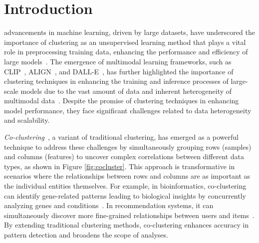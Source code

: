 \documentclass[journal]{IEEEtran}
\renewcommand{\cite}[1]{~\autocite{#1}}
\begin{document}
\section{Introduction}
 advancements in machine learning, driven by large datasets, have underscored the importance of clustering as an unsupervised learning method that plays a vital role in preprocessing training data, enhancing the performance and efficiency of large models\cite{raskutti2002CombiningClusteringCotraining, li2014ClusteringguidedSparseStructural, ghimatgar2018ImprovedFeatureSelection, li2023DistributedClusteringCooperative, bertsimas2020InterpretableClusteringOptimization}. The emergence of multimodal learning frameworks, such as CLIP\cite{radford2021LearningTransferableVisual}, ALIGN\cite{li2022BLIPBootstrappingLanguageimage}, and DALL-E\cite{ramesh2021ZeroshotTexttoimageGeneration}, has further highlighted the importance of clustering techniques in enhancing the training and inference processes of large-scale models due to the vast amount of data and inherent heterogeneity of multimodal data\cite{Chen2021Multimodal}. Despite the promise of clustering techniques in enhancing model performance, they face significant challenges related to data heterogeneity and scalability.

\textit{Co-clustering}\cite{cheng2000BiclusteringExpressionData, kluger2003SpectralBiclusteringMicroarray, yan2017CoclusteringMultidimensionalBig}, a variant of traditional clustering, has emerged as a powerful technique to address these challenges by simultaneously grouping rows (samples) and columns (features) to uncover complex correlations between different data types, as shown in Figure \ref{fig:cocluster}. This approach is transformative in scenarios where the relationships between rows and columns are as important as the individual entities themselves. For example, in bioinformatics, co-clustering can identify gene-related patterns leading to biological insights by concurrently analyzing genes and conditions\cite{higham2007SpectralClusteringIts, kluger2003SpectralBiclusteringMicroarray, madeira2004BiclusteringAlgorithmsBiological, zhao2012BiclusteringAnalysisPattern, golchev2015BiclusteringAnalysisGene}. In recommendation systems, it can simultaneously discover more fine-grained relationships between users and items\cite{dhillon2007WeightedGraphCuts, chen2023ParallelNonNegativeMatrix, bouchareb2019ModelBasedCoclustering}. By extending traditional clustering methods, co-clustering enhances accuracy in pattern detection and broadens the scope of analyses.
\end{document}
